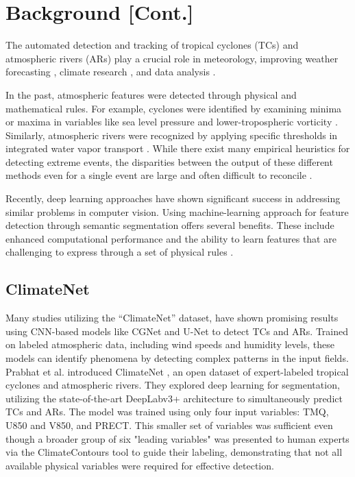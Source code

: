\section{Background [Cont.]}

The automated detection and tracking of tropical cyclones (TCs) and atmospheric rivers (ARs) play a crucial role in meteorology, improving weather forecasting \cite{hewson2010objective, hengstebeck2018radar}, climate research \cite{dawe2012statistical, lawrence2018characterizing}, and data analysis \cite{rautenhaus2017visualization, beckert2023three}.

In the past, atmospheric features were detected through physical and mathematical rules. For example, cyclones were identified by examining minima or maxima in variables like sea level pressure and lower-tropospheric vorticity \cite{neu2013imilast, bourdin2022intercomparison}. Similarly, atmospheric rivers were recognized by applying specific thresholds in integrated water vapor transport \cite{guan2015detection, shields2018atmospheric}. While there exist many empirical heuristics for detecting extreme events, the disparities between the output of these different methods even for a single event are large and often difficult to reconcile \cite{hodges1995feature, prabhat2015teca, shields2018atmospheric}.

Recently, deep learning approaches have shown significant success in addressing similar problems in computer vision. Using machine-learning approach for feature detection through semantic segmentation offers several benefits. These include enhanced computational performance \cite{boukabara2021outlook, higgins2023using} and the ability to learn features that are challenging to express through a set of physical rules \cite{prabhat2020climatenet, niebler2022automated, tian2023deep}. 

\subsection{ClimateNet}

Many studies utilizing the ``ClimateNet” dataset, have shown promising results using CNN-based models like CGNet and U-Net to detect TCs and ARs. Trained on labeled atmospheric data, including wind speeds and humidity levels, these models can identify phenomena by detecting complex patterns in the input fields. Prabhat et al. introduced ClimateNet \cite{prabhat2020climatenet}, an open dataset of expert-labeled tropical cyclones and atmospheric rivers. They explored deep learning for segmentation, utilizing the state-of-the-art DeepLabv3+ \cite{chen2018encoder,chollet2017xception} architecture to simultaneously predict TCs and ARs. The model was trained using only four input variables: TMQ, U850 and V850, and PRECT. This smaller set of variables was sufficient even though a broader group of six "leading variables" was presented to human experts via the ClimateContours tool to guide their labeling, demonstrating that not all available physical variables were required for effective detection.

